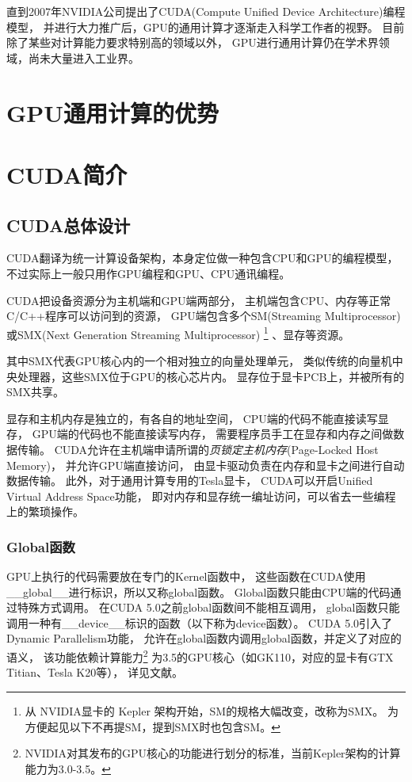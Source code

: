直到2007年NVIDIA公司提出了CUDA(Compute Unified Device Architecture)编程模型，
并进行大力推广后，GPU的通用计算才逐渐走入科学工作者的视野。
目前除了某些对计算能力要求特别高的领域以外，
GPU进行通用计算仍在学术界领域，尚未大量进入工业界。

\section{GPU通用计算的优势}

\TODO

\section{CUDA简介}

\subsection{CUDA总体设计}

CUDA翻译为统一计算设备架构，本身定位做一种包含CPU和GPU的编程模型，
不过实际上一般只用作GPU编程和GPU、CPU通讯编程。

CUDA把设备资源分为主机端和GPU端两部分，
主机端包含CPU、内存等正常C/C++程序可以访问到的资源，
GPU端包含多个SM(Streaming Multiprocessor)
或SMX(Next Generation Streaming Multiprocessor)
\footnote{从 NVIDIA显卡的 Kepler 架构开始，SM的规格大幅改变，改称为SMX。
为方便起见以下不再提SM，提到SMX时也包含SM。}
、显存等资源。

其中SMX代表GPU核心内的一个相对独立的向量处理单元，
类似传统的向量机中央处理器，这些SMX位于GPU的核心芯片内。
显存位于显卡PCB上，并被所有的SMX共享。

显存和主机内存是独立的，有各自的地址空间，
CPU端的代码不能直接读写显存，
GPU端的代码也不能直接读写内存，
需要程序员手工在显存和内存之间做数据传输。
CUDA允许在主机端申请所谓的\emph{页锁定主机内存}(Page-Locked Host Memory)，
并允许GPU端直接访问，
由显卡驱动负责在内存和显卡之间进行自动数据传输。
此外，对于通用计算专用的Tesla显卡，
CUDA可以开启Unified Virtual Address Space功能，
即对内存和显存统一编址访问，可以省去一些编程上的繁琐操作。
\cite{cudadoc-cprogrammingguide}

\subsubsection{Global函数}

GPU上执行的代码需要放在专门的Kernel函数中，
这些函数在CUDA使用\_\_global\_\_进行标识，所以又称global函数。
Global函数只能由CPU端的代码通过特殊方式调用。
在CUDA 5.0之前global函数间不能相互调用，
global函数只能调用一种有\_\_device\_\_标识的函数（以下称为device函数）。
CUDA 5.0引入了Dynamic Parallelism功能，
允许在global函数内调用global函数，并定义了对应的语义，
该功能依赖计算能力\footnote{NVIDIA对其发布的GPU核心的功能进行划分的标准，当前Kepler架构的计算能力为3.0-3.5。}%
为3.5的GPU核心（如GK110，对应的显卡有GTX Titian、Tesla K20等），
详见文献。

